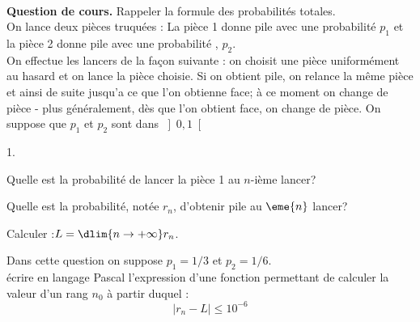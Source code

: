 \documentclass[11pt]{article}%
\begin{document}
\begin{exerciceAP}~\\
  \textbf{Question de cours.} Rappeler la formule des probabilités
  totales.\\[.2cm]
  On lance deux pièces truquées : La pièce 1 donne pile avec une
  probabilité $p_{1}$ et la pièce 2 donne pile avec une probabilité%
  , $p_{2}$. \\
  On effectue les lancers de la fa\c{c}on suivante : on choisit une
  pièce uniformément au hasard et on lance la pièce choisie. Si on
  obtient pile, on relance la même pièce et ainsi de suite jusqu'a ce
  que l'on obtienne face; à ce moment on change de pièce - plus
  généralement, dès que l'on obtient face, on change de pièce. On
  suppose que $p_{1}$ et $p_{2}$ sont dans $\left] 0,1\right[ $
  \begin{noliste}{1.}
    \setlength{\itemsep}{2mm}
  \item Quelle est la probabilité de lancer la pièce 1 au $n$-ième
    lancer?
    
  \item Quelle est la probabilité, notée $r_{n}$, d'obtenir pile au
    $\eme{n}$ lancer?
    
  \item Calculer :$L=\dlim{n\rightarrow +\infty }r_{n}$.
    
  \item Dans cette question on suppose $p_{1}=1/3$ et $p_{2}=1/6$.\\
    écrire en langage Pascal l'expression d'une fonction permettant de
    calculer la valeur d'un rang $n_{0}$ à partir duquel :%
    \begin{equation*}
      \left \vert r_{n}-L\right \vert \leq 10^{-6}
    \end{equation*}
  \end{noliste}



\end{exerciceAP}
\end{document}
